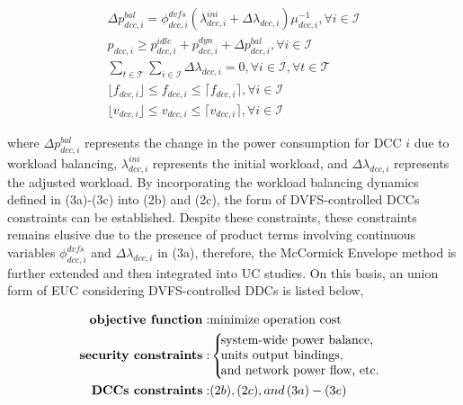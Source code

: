 \documentclass[lettersize,journal]{IEEEtran}
\begin{document}
\vspace{-0.25cm}
\begin{subequations}
  \begin{align}
    \varDelta p_{dcc,i}^{bal} = \phi_{dcc,i}^{dvfs} {\left ( \lambda_{dcc,i}^{ini} + \varDelta \lambda_{dcc,i}\right )}{\mu_{dcc,i}^{-1}}, \forall i\in \mathcal{I}\\
    p_{dcc,i} \geq p_{dcc,i}^{idle} \!+\! p_{dcc,i}^{dyn} + \varDelta p_{dcc,i}^{bal},\forall i\in\mathcal{I}\\
    \sum\nolimits_{t\in\mathcal{T}} \sum\nolimits_{i\in\mathcal{I}} \varDelta \lambda_{dcc,i} = 0, \forall i\in\mathcal{I}, \forall t\in\mathcal{T}\\
    \lfloor f_{dcc,i} \rfloor \leq f_{dcc,i} \leq \lceil f_{dcc,i} \rceil, \forall i\in \mathcal{I}\\
    \lfloor v_{dcc,i} \rfloor \leq v_{dcc,i} \leq \lceil v_{dcc,i} \rceil, \forall i\in \mathcal{I}
  \end{align}
\end{subequations}

\noindent
where $\varDelta p_{dcc,i}^{bal}$ represents the change in the power consumption for DCC $i$ due to workload balancing, $\lambda_{dcc,i}^{ini}$ represents the initial workload, and $\varDelta \lambda_{dcc,i}$ represents the adjusted workload. By incorporating the workload balancing dynamics defined in (3a)-(3c) into (2b) and (2c), the form of DVFS-controlled DCCs constraints can be established.
Despite these constraints, these constraints remains elusive due to the presence of product terms involving continuous variables $\phi_{dcc,i}^{dvfs}$ and $\varDelta \lambda_{dcc,i}$ in (3a), therefore, the McCormick Envelope method is further extended and then integrated into UC studies. On this basis, an union form of EUC considering DVFS-controlled DDCs is listed below,

\vspace{-0.25cm}
\begin{subequations}
  \begin{align}
    \text{\textbf{objective function}}: & \text{minimize operation cost}\\
      \text{\textbf{security constraints}}: & \left \{\!\!\!\! \begin{array}{l}\text{system-wide power balance,}\\ 
        \text{units output bindings,}\\
        \text{and network power flow, etc.}\end{array}\right.\\
        \text{\textbf{DCCs constraints}}:& (2b),(2c), and\, (3a)-(3e)
  \end{align}
\end{subequations}




\end{document}
